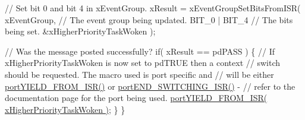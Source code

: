 \begin{DoxyPre}    // Set bit 0 and bit 4 in xEventGroup.
    xResult = xEventGroupSetBitsFromISR(
                        xEventGroup,    // The event group being updated.
                        BIT\_0 | BIT\_4   // The bits being set.
                        \&xHigherPriorityTaskWoken );\end{DoxyPre}



\begin{DoxyPre}    // Was the message posted successfully?
    if( xResult == pdPASS )
    \{
        // If xHigherPriorityTaskWoken is now set to pdTRUE then a context
        // switch should be requested.  The macro used is port specific and
        // will be either \hyperlink{portmacro_8h_aac6850c66595efdc02a8bbb95fb4648e}{portYIELD\_FROM\_ISR()} or \hyperlink{portmacro_8h_a63b994040c62c9685490a71c87a13d8a}{portEND\_SWITCHING\_ISR()} -
        // refer to the documentation page for the port being used.
        \hyperlink{portmacro_8h_aac6850c66595efdc02a8bbb95fb4648e}{portYIELD\_FROM\_ISR( xHigherPriorityTaskWoken )};
    \}
 \}
  \end{DoxyPre}
 